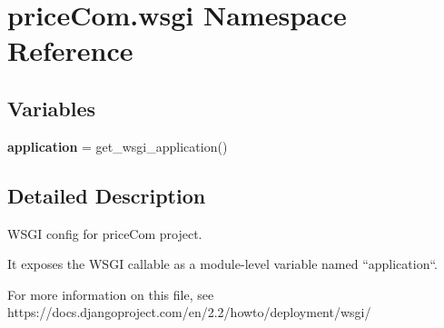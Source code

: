 \hypertarget{namespacepriceCom_1_1wsgi}{}\section{price\+Com.\+wsgi Namespace Reference}
\label{namespacepriceCom_1_1wsgi}
\subsection*{Variables}
\begin{DoxyCompactItemize}
\item 
\mbox{\label{namespacepriceCom_1_1wsgi_ac6668cb61986548d66296947f0593411}} 
{\bfseries application} = get\+\_\+wsgi\+\_\+application()
\end{DoxyCompactItemize}


\subsection{Detailed Description}
\begin{DoxyVerb}WSGI config for priceCom project.

It exposes the WSGI callable as a module-level variable named ``application``.

For more information on this file, see
https://docs.djangoproject.com/en/2.2/howto/deployment/wsgi/
\end{DoxyVerb}
 